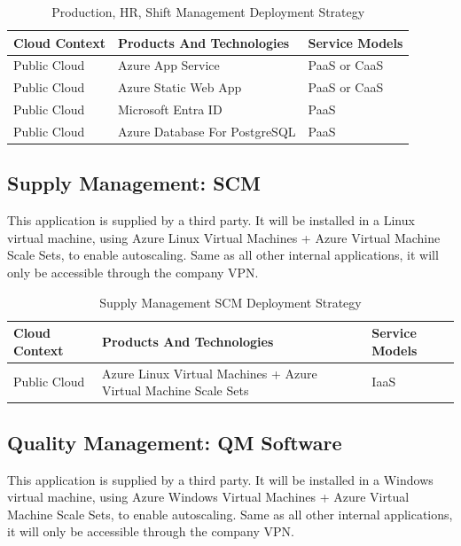 \documentclass{llncs}
\begin{document}
\begin{table}[h!]
    \centering
    \begin{tabular}{lll}
        \hline
        \textbf{Cloud Context} & \textbf{Products And Technologies} & \textbf{Service Models} \\
        \hline
 Public Cloud           & Azure App Service                  & PaaS or CaaS            \\
        \hline
 Public Cloud           & Azure Static Web App               & PaaS or CaaS            \\

        \hline
 Public Cloud           & Microsoft Entra ID                 & PaaS                    \\
        \hline
 Public Cloud           & Azure Database For PostgreSQL      & PaaS                    \\
        \hline
    \end{tabular}
    \caption{Production, HR, Shift Management Deployment Strategy}
\end{table}

\subsection{Supply Management: SCM}
This application is supplied by a third party. It will be installed in a Linux virtual machine, using Azure Linux Virtual Machines + Azure Virtual Machine Scale Sets, to enable autoscaling.
Same as all other internal applications, it will only be accessible through the company VPN.\\

\begin{table}[h!]
    \centering
    \begin{tabular}{lll}
        \hline
        \textbf{Cloud Context} & \textbf{Products And Technologies}                              & \textbf{Service Models} \\
        \hline
 Public Cloud           & Azure Linux Virtual Machines + Azure Virtual Machine Scale Sets & IaaS                    \\
    \end{tabular}
    \caption{Supply Management SCM Deployment Strategy}
\end{table}

\subsection{Quality Management: QM Software}
This application is supplied by a third party. It will be installed in a Windows virtual machine, using Azure Windows Virtual Machines + Azure Virtual Machine Scale Sets, to enable autoscaling.
Same as all other internal applications, it will only be accessible through the company VPN.\\
\end{document}
